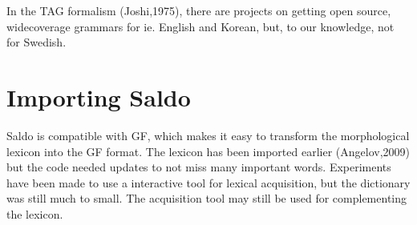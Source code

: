 \documentclass{report}
\begin{document}
In the TAG formalism (Joshi,1975), there are projects on getting open source, widecoverage grammars
for ie. English and Korean, but, to our knowledge, not for Swedish.  


\chapter{Importing Saldo}
\label{sec:prog.saldo}
Saldo is compatible with GF, which makes it easy to transform the morphological
lexicon into the GF format. The lexicon has been imported earlier (Angelov,2009)
but the code needed updates to not miss many important words.
Experiments have been made to use a interactive tool for lexical acquisition,
but the dictionary was still much to small. The acquisition tool may still
be used for complementing the lexicon.
\end{document}
